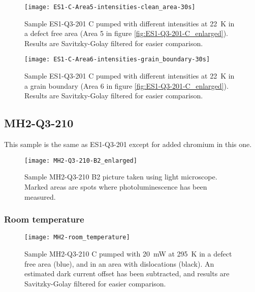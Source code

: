\begin{figure}[H]
\centering
\texttt{[image: ES1-C-Area5-intensities-clean\_area-30s]}
\caption[ES1-Q3-201 at a defect free area]{Sample ES1-Q3-201 C pumped with different intensities at 22~K in a defect free area (Area 5 in figure \ref{fig:ES1-Q3-201-C_enlarged}). Results are Savitzky-Golay filtered for easier comparison.}
\label{fig:ES1-C-Area5-intensities-clean_area-30s}%
\end{figure}

\begin{figure}[H]
\centering
\texttt{[image: ES1-C-Area6-intensities-grain\_boundary-30s]}
\caption[ES1-Q3-201 at a grain boundary]{Sample ES1-Q3-201 C pumped with different intensities at 22~K in a grain boundary (Area 6 in figure \ref{fig:ES1-Q3-201-C_enlarged}). Results are Savitzky-Golay filtered for easier comparison.}
\label{fig:ES1-C-Area6-intensities-grain_boundary-30s}%
\end{figure}





\subsection{MH2-Q3-210}

This sample is the same as ES1-Q3-201 except for added chromium in this one.



\begin{figure}[H]
\centering
\texttt{[image: MH2-Q3-210-B2\_enlarged]}
\caption[MH2-Q3-210 B2 from light microscope]{Sample MH2-Q3-210 B2 picture taken using light microscope. Marked areas are spots where photoluminescence has been measured.}
\label{fig:MH2-Q3-210-B2_enlarged}%
\end{figure}



\subsubsection{Room temperature}

\begin{figure}[H]
\centering
\texttt{[image: MH2-room\_temperature]}
\caption[MH2-Q3-210 at room temperature]{Sample MH2-Q3-210 C pumped with 20~mW at 295~K in a defect free area (blue), and in an area with dislocations (black). An estimated dark current offset has been subtracted, and results are Savitzky-Golay filtered for easier comparison.}
\label{fig:MH2-room_temperature}%
\end{figure}

